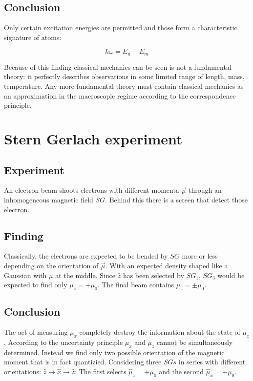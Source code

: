   \subsection{Conclusion}
  Only certain excitation energies are permitted and those form a characteristic signature of atoms:

  $$\hbar\omega = E_n-E_m$$

  Because of this finding classical mechanics can be seen is not a fundamental theory: it perfectly describes observations in some limited range of length, mass, temperature.
  Any more fundamental theory must contain classical mechanics as an approximation in the macroscopic regime according to the correspondence principle.

\section{Stern Gerlach experiment}

  \subsection{Experiment}
  An electron beam shoots electrons with different momenta $\vec{\mu}$ through an inhomogeneous magnetic field $SG$.
  Behind this there is a screen that detect those electron.

  \subsection{Finding}
  Classically, the electrons are expected to be bended by $SG$ more or less depending on the orientation of $\vec{\mu}$.
  With an expected density shaped like a Gaussian with $\mu$ at the middle.
  Since $\hat{z}$ has been selected by $SG_1$, $SG_3$ would  be expected to find only $\mu_z = + \mu_0$.
  The final beam contains $\mu_z =\pm \mu_0$.

  \subsection{Conclusion}
  The act of measuring $\mu_x$ completely destroy the information about the state of $\mu_z$.
  According to the uncertainty principle $\mu_x$ and $\mu_z$ cannot be simultaneously determined.
  Instead we find only two possible orientation of the magnetic moment that is in fact quantizied.
  Considering three $SGs$ in series with different orientations: $\hat{z}\rightarrow\hat{x}\rightarrow\hat{z}$:
  The first selects $\hat{\mu}_z = +\mu_0$ and the second $\hat{\mu}_x = +\mu_0$.

